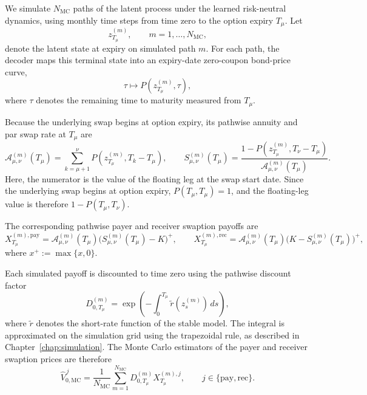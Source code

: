 We simulate \(N_{\mathrm{MC}}\) paths of the latent process under the learned risk-neutral dynamics, using monthly time steps from time zero to the option expiry \(T_{\mu}\). Let
\[
z_{T_{\mu}}^{(m)},
\qquad
m=1,\ldots,N_{\mathrm{MC}},
\]
denote the latent state at expiry on simulated path \(m\). For each path, the decoder maps this terminal state into an expiry-date zero-coupon bond-price curve,
\[
\tau \longmapsto
P\!\left(z_{T_{\mu}}^{(m)},\tau\right),
\]
where \(\tau\) denotes the remaining time to maturity measured from \(T_{\mu}\).

Because the underlying swap begins at option expiry, its pathwise annuity and par swap rate at \(T_{\mu}\) are
\begin{equation}
\mathcal A_{\mu,\nu}^{(m)}(T_{\mu})
=
\sum_{k=\mu+1}^{\nu}
P\!\left(z_{T_{\mu}}^{(m)},T_k-T_{\mu}\right),
\qquad
S_{\mu,\nu}^{(m)}(T_{\mu})
=
\frac{
1-P\!\left(z_{T_{\mu}}^{(m)},T_{\nu}-T_{\mu}\right)
}{
\mathcal A_{\mu,\nu}^{(m)}(T_{\mu})
}.
\label{eq:pathwise_annuity_swap_rate}
\end{equation}
Here, the numerator is the value of the floating leg at the swap start date. Since the underlying swap begins at option expiry, \(P(T_{\mu},T_{\mu})=1\), and the floating-leg value is therefore \(1-P(T_{\mu},T_{\nu})\).

The corresponding pathwise payer and receiver swaption payoffs are
\begin{equation}
X_{T_{\mu}}^{(m),\mathrm{pay}}
=
\mathcal A_{\mu,\nu}^{(m)}(T_{\mu})
\bigl(S_{\mu,\nu}^{(m)}(T_{\mu})-K\bigr)^+,
\qquad
X_{T_{\mu}}^{(m),\mathrm{rec}}
=
\mathcal A_{\mu,\nu}^{(m)}(T_{\mu})
\bigl(K-S_{\mu,\nu}^{(m)}(T_{\mu})\bigr)^+,
\label{eq:pathwise_swaption_payoffs}
\end{equation}
where \(x^+ := \max\{x,0\}\).

Each simulated payoff is discounted to time zero using the pathwise discount factor
\[
D_{0,T_{\mu}}^{(m)}
=
\exp\!\left(
-\int_0^{T_{\mu}} \widetilde r\!\left(z_s^{(m)}\right)\,ds
\right),
\]
where \(\widetilde r\) denotes the short-rate function of the stable model. The integral is approximated on the simulation grid using the trapezoidal rule, as described in Chapter~\ref{chap:simulation}. The Monte Carlo estimators of the payer and receiver swaption prices are therefore
\begin{equation}
\widehat V_{0,\mathrm{MC}}^{\,j}
=
\frac{1}{N_{\mathrm{MC}}}
\sum_{m=1}^{N_{\mathrm{MC}}}
D_{0,T_{\mu}}^{(m)}
X_{T_{\mu}}^{(m),j},
\qquad
j\in\{\mathrm{pay},\mathrm{rec}\}.
\label{eq:mc_swaption_prices}
\end{equation}


